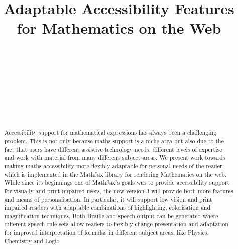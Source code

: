 \documentclass{sig-alternate}
\begin{document}


\title{Adaptable Accessibility Features for Mathematics on the Web}
  

\author{
  \\
  \\
  \\
  \\
  \\
  \\
  \\
}

\maketitle

\begin{abstract}
  Accessibility support for mathematical expressions has always been a
  challenging problem. This is not only because maths support is a niche area
  but also due to the fact that users have different assistive technology needs,
  different levels of expertise and work with material from many different
  subject areas. We present work towards making maths accessibility more
  flexibly adaptable for personal needs of the reader, which is implemented in
  the MathJax library for rendering Mathematics on the web. While since its
  beginnings one of MathJax's goals was to provide accessibility support for
  visually and print impaired users, the new version 3 will provide both more
  features and means of personalisation.  In particular, it will support low
  vision and print impaired readers with adaptable combinations of highlighting,
  colorisation and magnification techniques. Both Braille and speech output can
  be generated where different speech rule sets allow readers to flexibly change
  presentation and adaptation for improved interpretation of formulas in
  different subject areas, like Physics, Chemistry and Logic.
\end{abstract}

\end{document}
